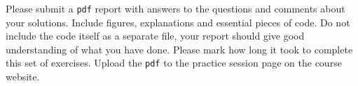 \documentclass[a4paper,11pt]{article}
\begin{document}
\ \\
\ \\
\ \\
\ \\
\ \\
Please submit a \texttt{pdf} report with answers to the questions and comments about your solutions. Include figures, explanations and essential pieces of code. Do not include the code itself as a separate file, your report should give good understanding of what you have done. Please mark how long it took to complete this set of exercises. Upload the \texttt{pdf} to the practice session page on the course website.
\end{document}
